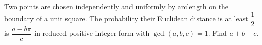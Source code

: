 Two points are chosen independently and uniformly by arclength on the boundary of a unit square. The probability their Euclidean distance is at least $\dfrac{1}{2}$ is $\dfrac{a-b\pi}{c}$ in reduced positive-integer form with $\gcd(a,b,c)=1 $. Find $ a+b+c $.

